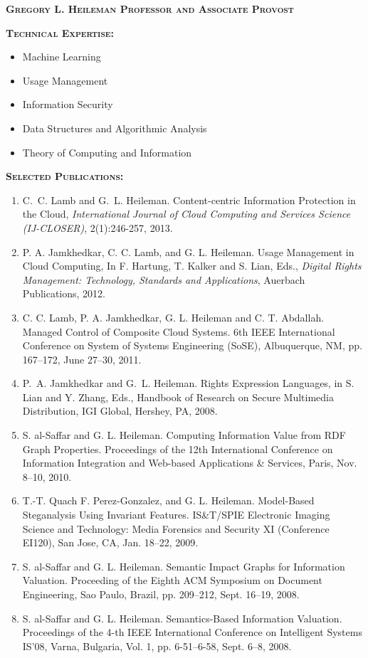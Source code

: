 \documentclass{sbir}
\begin{document}
{\textbf{\textsc{Gregory L. Heileman \hfill Professor and Associate Provost}}

\vspace{-18pt}
{\textcolor{black}{\makebox[6.5in]{\hrulefill}} 
\textbf{\textsc{Technical Expertise:}}
\vspace{-8pt}
\begin{multicols}{2}
 \begin{itemize}
  \item Machine Learning
  \item Usage Management
  \item Information Security
  \item Data Structures and Algorithmic Analysis
  \item Theory of Computing and Information	
 \end{itemize}
\end{multicols}

\vspace{-16pt}
\textbf{\textsc{Selected Publications:}}
\vspace{-8pt}
\begin{enumerate}
\item C.~C. Lamb and G.~L. Heileman. Content-centric Information Protection in the Cloud, {\sl International Journal of Cloud Computing and Services Science  (IJ-CLOSER)}, 2(1):246-257, 2013.
\item P. A. Jamkhedkar, C. C. Lamb, and G. L. Heileman. Usage Management in Cloud Computing, In F. Hartung, T. Kalker and S. Lian, Eds., {\sl Digital Rights Management: Technology, Standards and Applications}, Auerbach Publications, 2012. 
\item C. C. Lamb, P. A. Jamkhedkar, G. L. Heileman and C. T. Abdallah. Managed Control of Composite Cloud Systems. 6th IEEE International Conference on System of Systems Engineering (SoSE), Albuquerque, NM, pp. 167--172, June 27--30, 2011.
\item P.~A. Jamkhedkar and G.~L. Heileman. Rights Expression Languages, in S. Lian and Y. Zhang, Eds., {Handbook of Research on Secure Multimedia Distribution}, IGI Global, Hershey, PA, 2008. 
\item S. al-Saffar and G. L. Heileman. Computing Information Value from RDF Graph Properties. Proceedings of the 12th International Conference on Information Integration and Web-based Applications \& Services, Paris, Nov. 8--10, 2010.
\item T.-T. Quach F. Perez-Gonzalez, and G. L. Heileman. Model-Based Steganalysis Using Invariant Features. IS\&T/SPIE Electronic Imaging Science and Technology: Media Forensics and Security XI (Conference EI120), San Jose, CA, Jan. 18--22, 2009.
\item S. al-Saffar and G. L. Heileman. Semantic Impact Graphs for Information Valuation. Proceeding of the Eighth ACM Symposium on Document Engineering, Sao Paulo, Brazil, pp. 209--212, Sept. 16--19, 2008.
\item S. al-Saffar and G. L. Heileman. Semantics-Based Information Valuation. Proceedings of the 4-th IEEE International Conference on Intelligent Systems IS'08, Varna, Bulgaria, Vol. 1, pp. 6-51--6-58, Sept. 6--8, 2008.
\end{enumerate}

}}
\end{document}
